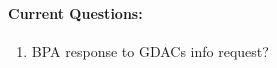 \documentclass[12pt]{article}
\begin{document}
\begin{multicols}{2}

	\paragraph{Current Questions:}
	\begin{enumerate}
\itemsep0em 
	\item BPA response to GDACs info request?
	\end{enumerate}
	

\end{multicols}
\end{document}
